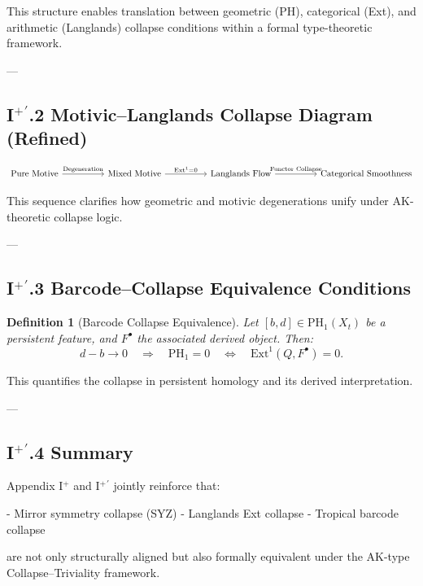 \documentclass[11pt]{article}
\newtheorem{definition}[theorem]{Definition}
\begin{document}
This structure enables translation between geometric (PH), categorical (Ext),  
and arithmetic (Langlands) collapse conditions within a formal type-theoretic framework.

---

\subsection*{I$^+\!{}^\prime$.2 Motivic–Langlands Collapse Diagram (Refined)}

\[
\begin{tikzcd}[column sep=huge, row sep=large]
\text{Pure Motive} \arrow[r, "\text{Degeneration}"]
& \text{Mixed Motive} \arrow[r, "\mathrm{Ext}^1 = 0"]
& \text{Langlands Flow} \arrow[r, "\text{Functor Collapse}"]
& \text{Categorical Smoothness}
\end{tikzcd}
\]

This sequence clarifies how geometric and motivic degenerations unify  
under AK-theoretic collapse logic.

---

\subsection*{I$^+\!{}^\prime$.3 Barcode–Collapse Equivalence Conditions}

\begin{definition}[Barcode Collapse Equivalence]
Let $[b,d] \in \mathrm{PH}_1(X_t)$ be a persistent feature, and $F^\bullet$ the associated derived object. Then:
\[
d - b \to 0 \quad \Rightarrow \quad \mathrm{PH}_1 = 0 \quad \Leftrightarrow \quad \mathrm{Ext}^1(Q, F^\bullet) = 0.
\]
\end{definition}

This quantifies the collapse in persistent homology and its derived interpretation.

---

\subsection*{I$^+\!{}^\prime$.4 Summary}

Appendix I$^+$ and I$^+\!{}^\prime$ jointly reinforce that:

- Mirror symmetry collapse (SYZ)  
- Langlands Ext collapse  
- Tropical barcode collapse  

are not only structurally aligned but also formally equivalent  
under the AK-type Collapse–Triviality framework.
\end{document}
